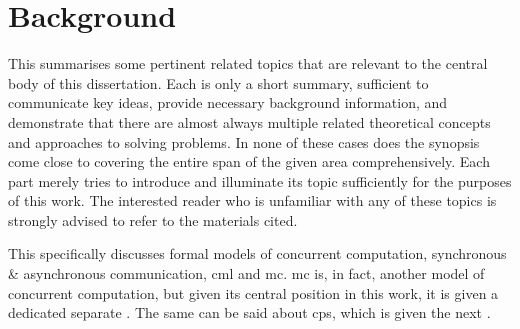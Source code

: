 \chapter{\label{chap:back}Background}
This  summarises some pertinent related topics that are relevant to the central body of this dissertation.  Each is only a short summary, sufficient to communicate key ideas, provide necessary background information, and demonstrate that there are almost always multiple related theoretical concepts and approaches to solving problems.  In none of these cases does the synopsis come close to covering the entire span of the given area comprehensively.  Each part merely tries to introduce and illuminate its topic sufficiently for the purposes of this work.  The interested reader who is unfamiliar with any of these topics is strongly advised to refer to the materials cited.


This  specifically discusses formal models of concurrent computation, synchronous \& asynchronous communication, \gls{cml} and \gls{mc}.  \Gls{mc} is, in fact, another model of concurrent computation, but given its central position in this work, it is given a dedicated separate .  The same can be said about \gls{cps}, which is given the next .




